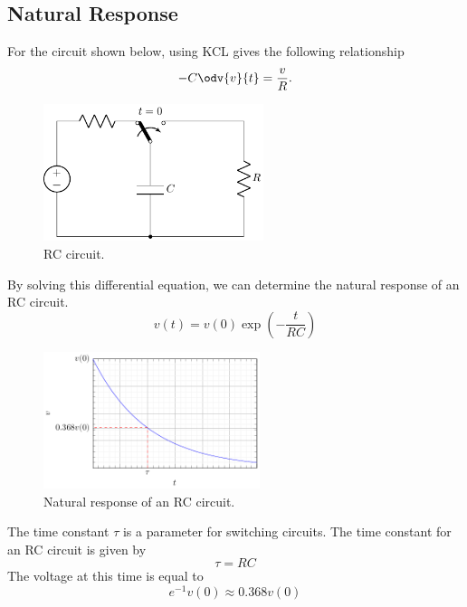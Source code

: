 \documentclass{article}
\begin{document}
\subsection{Natural Response}
\begin{definition}
    For the circuit shown below, using KCL gives the following relationship
    \begin{equation*}
        -C \odv{v}{t} = \frac{v}{R}.
    \end{equation*}
    \begin{figure}[H]
        \centering
        \includegraphics[height = 4cm, keepaspectratio = true]{figures/rc_natural.pdf}
        \caption{RC circuit.}
    \end{figure}
    By solving this differential equation, we can determine the natural response of an
    RC circuit.
    \begin{equation*}
        v(t) = v(0)\exp{\left( -\frac{t}{RC} \right)}
    \end{equation*}
    \begin{figure}[H]
        \centering
        \includegraphics[height = 4cm, keepaspectratio = true]{figures/rc_natural_plot.pdf}
        \caption{Natural response of an RC circuit.}
    \end{figure}
\end{definition}
\begin{definition}
    The time constant \(\tau\) is a parameter for switching circuits. The time constant for an RC circuit is given by
    \begin{equation*}
        \tau = RC
    \end{equation*}
    The voltage at this time is equal to
    \begin{equation*}
        e^{-1}v(0) \approx 0.368v(0)
    \end{equation*}
\end{definition}
\end{document}
